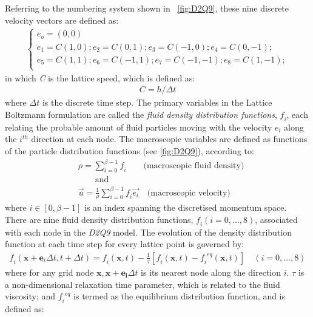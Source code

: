 Referring to the numbering system shown in ~\cref{fig:D2Q9}, these nine discrete velocity vectors are defined as:
\begin{align} 
\begin{cases}
\mathit{e_o}=(0,0)\\
\mathit{e_1}=\mathit{C}(1,0); \mathit{e_2}=\mathit{C}(0,1); \mathit{e_3}=\mathit{C}(-1,0); \mathit{e_4}=\mathit{C}(0,-1); \\
\mathit{e_5}=\mathit{C}(1,1); \mathit{e_6}=\mathit{C}(-1,1); \mathit{e_7}=\mathit{C}(-1,-1); \mathit{e_8}=\mathit{C}(1,-1); \\ 
\end{cases}
\end{align}
in which \textit{C} is the lattice speed, which is defined as:
\begin{align}
\mathit{C}=\mathit{h}/\Delta t
\end{align}
where $\Delta \mathit{t}$ is the discrete time step. The primary variables in the Lattice Boltzmann formulation are called the \textit{fluid density distribution functions}, $\mathit{f_i}$, each relating the probable amount of fluid particles moving with the velocity $\mathit{e_i}$ along the $\mathit{i^{th}}$ direction at each node. The macroscopic variables are defined as functions of the particle distribution functions (see \cref{fig:D2Q9}), according to:
\begin{align} 
 \nonumber
& \rho=\sum\limits_{\mathit{i}=0}^{\beta - 1}{\mathit{f_i}} \qquad \mbox{(macroscopic fluid density)} \\ 
 \nonumber
& \qquad \mbox{and} \\ 
& \overrightarrow{\mathit{u}}=\frac{1}{\rho} \sum\limits_{\mathit{i}=0}^{\beta -1}{\mathit{f_i}\overrightarrow{\mathit{e_i}}} \quad \mbox{(macroscopic velocity)}
\label{eq:lbm_macroscopic}
\end{align} 
where $\mathit{i} \in [0, \beta -1]$ is an index spanning the discretised momentum space. There are nine fluid density distribution functions, $\mathit{f_i}(\mathit{i}=0,\dots,8)$, associated with each node in the \textit{D2Q9} model. The evolution of the density distribution function at each time step for every lattice point is governed by:
\begin{align} 
\label{eq:stream}
\mathit{f_i}(\mathbf{x}+\mathbf{e}_{\mathit{i}} \Delta t, t + \Delta t) = \mathit{f_i}(\mathbf{x},t) - \frac{1}{\tau} [\mathit{f_i}(\mathbf{x},t) -\mathit{f_i}^{\mathit{eq}}(\mathbf{x},t)] \quad (\mathit{i}=0,\dots,8)
\end{align}
where for any grid node $\mathbf{x},\mathbf{x}+\mathbf{e_i} \Delta t$ is its nearest node along the direction $\mathit{i}$. $\tau$ is a non-dimensional relaxation time parameter, which is related to the fluid viscosity; and $\mathit{f_i}^{\mathit{eq}}$ is termed as the equilibrium distribution function, and is defined as:
